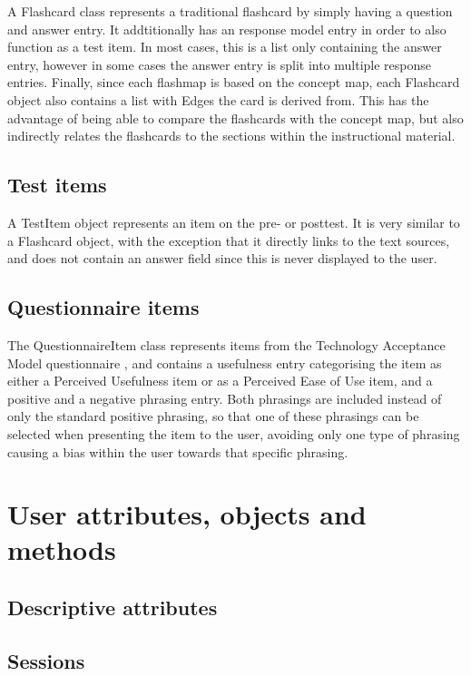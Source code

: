 A Flashcard class represents a traditional flashcard by simply having a question and answer entry. It addtitionally has an response model entry in order to also function as a test item. In most cases, this is a list only containing the answer entry, however in some cases the answer entry is split into multiple response entries. Finally, since each flashmap is based on the concept map, each Flashcard object also contains a list with Edges the card is derived from. This has the advantage of being able to compare the flashcards with the concept map, but also indirectly relates the flashcards to the sections within the instructional material.

\subsection{Test items}

A TestItem object represents an item on the pre- or posttest. It is very similar to a Flashcard object, with the exception that it directly links to the text sources, and does not contain an answer field since this is never displayed to the user.

\subsection{Questionnaire items}

The QuestionnaireItem class represents items from the Technology Acceptance Model questionnaire \cite{tamq}, and contains a usefulness entry categorising the item as either a Perceived Usefulness item or as a Perceived Ease of Use item, and a positive and a negative phrasing entry. Both phrasings are included instead of only the standard positive phrasing, so that one of these phrasings can be selected when presenting the item to the user, avoiding only one type of phrasing causing a bias within the user towards that specific phrasing.

\section{User attributes, objects and methods}

\subsection{Descriptive attributes}

\subsection{Sessions}

